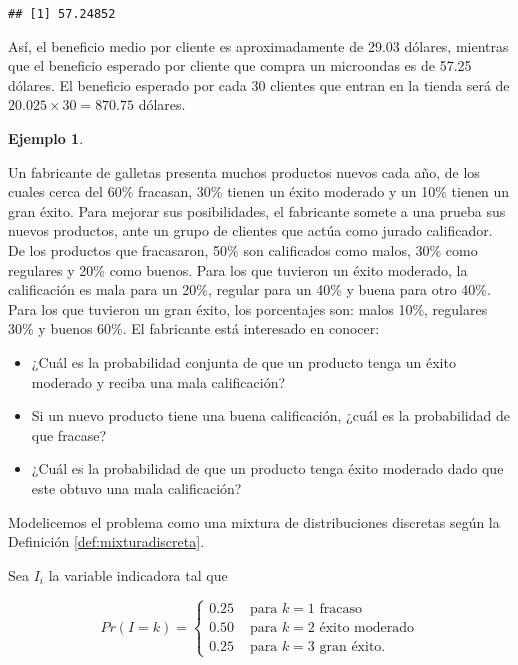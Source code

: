 \documentclass[
]{book}
\theoremstyle{definition}
\theoremstyle{definition}
\newtheorem{example}{Ejemplo}[chapter]
\theoremstyle{definition}
\theoremstyle{definition}
\theoremstyle{remark}
\begin{document}
\begin{verbatim}
## [1] 57.24852
\end{verbatim}

Así, el beneficio medio por cliente es aproximadamente de 29.03 dólares, mientras que el beneficio esperado por cliente que compra un microondas es de 57.25 dólares. El beneficio esperado por cada 30 clientes que entran en la tienda será de \(20.025 \times 30=870.75\) dólares.

\begin{example}
\protect\hypertarget{exm:mixtura2}{}\label{exm:mixtura2}

Un fabricante de galletas presenta muchos productos nuevos cada año, de los cuales cerca del 60\% fracasan, 30\% tienen un éxito moderado y un 10\% tienen un gran éxito. Para mejorar sus posibilidades, el fabricante somete a una prueba sus nuevos productos, ante un grupo de clientes que actúa como jurado calificador. De los productos que fracasaron, 50\% son calificados como malos, 30\% como regulares y 20\% como buenos. Para los que tuvieron un éxito moderado, la calificación es mala para un 20\%, regular para un 40\% y buena para otro 40\%. Para los que tuvieron un gran éxito, los porcentajes son: malos 10\%, regulares 30\% y buenos 60\%. El fabricante está interesado en conocer:

\begin{itemize}
\item
  ¿Cuál es la probabilidad conjunta de que un producto tenga un éxito moderado y reciba una mala calificación?
\item
  Si un nuevo producto tiene una buena calificación, ¿cuál es la probabilidad de que fracase?
\item
  ¿Cuál es la probabilidad de que un producto tenga éxito moderado dado que este obtuvo una mala calificación?
\end{itemize}

\end{example}

Modelicemos el problema como una mixtura de distribuciones discretas según la Definición \ref{def:mixturadiscreta}.

Sea \(I_i\) la variable indicadora tal que

\begin{equation*}
Pr(I = k) = 
\begin{cases}
0.25 & \text{ para } k = 1 \text{ fracaso}\\
0.50 & \text{ para } k = 2 \text{ éxito moderado}\\
0.25 & \text{ para } k = 3 \text{ gran éxito}.
\end{cases}
\end{equation*}
\end{document}
